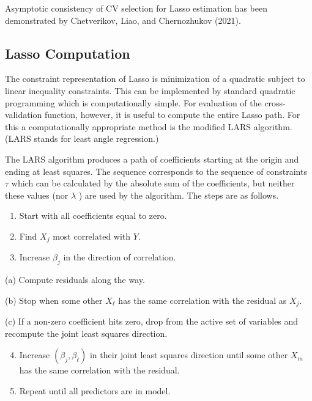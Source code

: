 \documentclass[10pt]{article}
\begin{document}
Asymptotic consistency of CV selection for Lasso estimation has been demonstrated by Chetverikov, Liao, and Chernozhukov (2021).

\subsection{Lasso Computation}
The constraint representation of Lasso is minimization of a quadratic subject to linear inequality constraints. This can be implemented by standard quadratic programming which is computationally simple. For evaluation of the cross-validation function, however, it is useful to compute the entire Lasso path. For this a computationally appropriate method is the modified LARS algorithm. (LARS stands for least angle regression.)

The LARS algorithm produces a path of coefficients starting at the origin and ending at least squares. The sequence corresponds to the sequence of constraints $\tau$ which can be calculated by the absolute sum of the coefficients, but neither these values (nor $\lambda$ ) are used by the algorithm. The steps are as follows.

\begin{enumerate}
  \item Start with all coefficients equal to zero.

  \item Find $X_{j}$ most correlated with $Y$.

  \item Increase $\beta_{j}$ in the direction of correlation.

\end{enumerate}

(a) Compute residuals along the way.

(b) Stop when some other $X_{\ell}$ has the same correlation with the residual as $X_{j}$.

(c) If a non-zero coefficient hits zero, drop from the active set of variables and recompute the joint least squares direction.

\begin{enumerate}
  \setcounter{enumi}{3}
  \item Increase $\left(\beta_{j}, \beta_{\ell}\right)$ in their joint least squares direction until some other $X_{m}$ has the same correlation with the residual.

  \item Repeat until all predictors are in model.

\end{enumerate}
\end{document}
